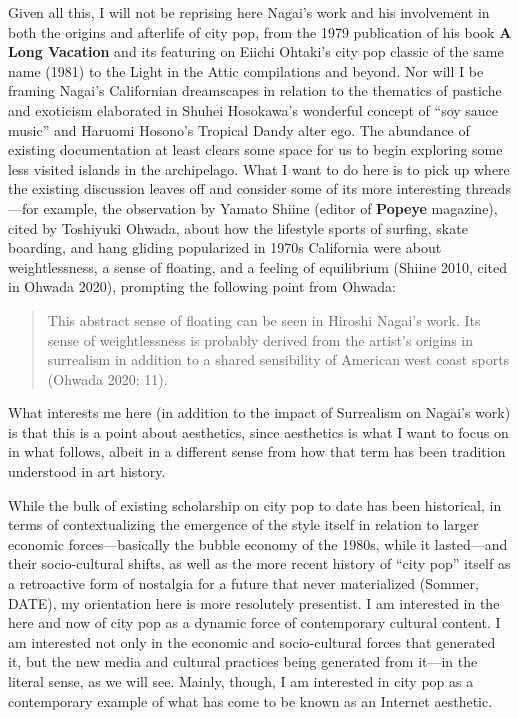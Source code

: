 \documentclass[
  letterpaper,
  DIV=11,
  numbers=noendperiod,
  oneside]{scrartcl}
\begin{document}
Given all this, I will not be reprising here Nagai's work and his
involvement in both the origins and afterlife of city pop, from the 1979
publication of his book \textbf{A Long Vacation} and its featuring on
Eiichi Ohtaki's city pop classic of the same name (1981) to the Light in
the Attic compilations and beyond. Nor will I be framing Nagai's
Californian dreamscapes in relation to the thematics of pastiche and
exoticism elaborated in Shuhei Hosokawa's wonderful concept of ``soy
sauce music'' and Haruomi Hosono's Tropical Dandy alter ego. The
abundance of existing documentation at least clears some space for us to
begin exploring some less visited islands in the archipelago. What I
want to do here is to pick up where the existing discussion leaves off
and consider some of its more interesting threads---for example, the
observation by Yamato Shiine (editor of \textbf{Popeye} magazine), cited
by Toshiyuki Ohwada, about how the lifestyle sports of surfing, skate
boarding, and hang gliding popularized in 1970s California were about
weightlessness, a sense of floating, and a feeling of equilibrium
(Shiine 2010, cited in Ohwada 2020), prompting the following point from
Ohwada:

\begin{quote}
This abstract sense of floating can be seen in Hiroshi Nagai's work. Its
sense of weightlessness is probably derived from the artist's origins in
surrealism in addition to a shared sensibility of American west coast
sports (Ohwada 2020: 11).
\end{quote}

What interests me here (in addition to the impact of Surrealism on
Nagai's work) is that this is a point about aesthetics, since aesthetics
is what I want to focus on in what follows, albeit in a different sense
from how that term has been tradition understood in art history.

While the bulk of existing scholarship on city pop to date has been
historical, in terms of contextualizing the emergence of the style
itself in relation to larger economic forces---basically the bubble
economy of the 1980s, while it lasted---and their socio-cultural shifts,
as well as the more recent history of ``city pop'' itself as a
retroactive form of nostalgia for a future that never materialized
(Sommer, DATE), my orientation here is more resolutely presentist. I am
interested in the here and now of city pop as a dynamic force of
contemporary cultural content. I am interested not only in the economic
and socio-cultural forces that generated it, but the new media and
cultural practices being generated from it---in the literal sense, as we
will see. Mainly, though, I am interested in city pop as a contemporary
example of what has come to be known as an Internet aesthetic.
\end{document}
